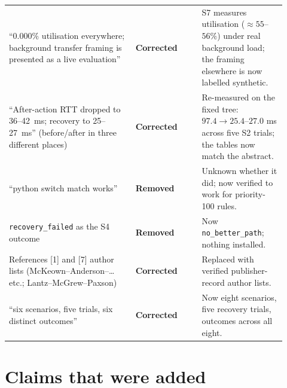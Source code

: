 \documentclass[11pt,a4paper]{article}
\begin{document}
\begin{longtable}{@{}p{0.42\linewidth}p{0.22\linewidth}p{0.28\linewidth}@{}}
``$0.000\%$ utilisation everywhere; background transfer framing is presented
as a live evaluation'' & \textbf{Corrected} & S7 measures utilisation
($\approx 55$–$56\%$) under real background load; the framing elsewhere is
now labelled synthetic. \\
``After-action RTT dropped to 36--42~ms; recovery to 25--27~ms'' (before/after
in three different places) & \textbf{Corrected} & Re-measured on the fixed tree:
$97.4 \to 25.4$--$27.0$ ms across five S2 trials; the tables now match the
abstract. \\
``python switch match works'' & \textbf{Removed} & Unknown whether it did;
now verified to work for priority-100 rules. \\
\texttt{recovery\_failed} as the S4 outcome & \textbf{Removed} & Now
\texttt{no\_better\_path}; nothing installed. \\
References [1] and [7] author lists (McKeown--Anderson--\ldots etc.; Lantz--McGrew--Paxson) &
\textbf{Corrected} & Replaced with verified publisher-record author lists. \\
``six scenarios, five trials, six distinct outcomes'' & \textbf{Corrected} &
Now eight scenarios, five recovery trials, outcomes across all eight. \\
\bottomrule
\end{longtable}

\section{Claims that were added}
\end{document}

